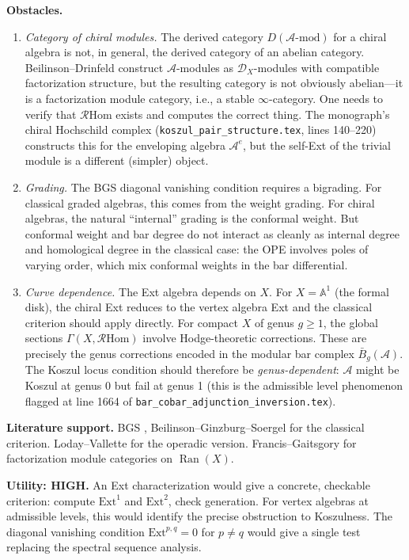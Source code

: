 \documentclass[11pt]{article}
\theoremstyle{remark}
\newcommand{\cA}{\mathcal{A}}
\newcommand{\barB}{\bar{B}}
\newcommand{\Ext}{\mathrm{Ext}}
\newcommand{\Hom}{\mathrm{Hom}}
\newcommand{\Ran}{\operatorname{Ran}}
\begin{document}
\textbf{Obstacles.}
\begin{enumerate}[label=(A\arabic*)]
\item \emph{Category of chiral modules.}  The derived category $D(\cA\text{-mod})$ for a chiral algebra is not, in general, the derived category of an abelian category.  Beilinson--Drinfeld \cite{BD04} construct $\cA$-modules as $\mathcal{D}_X$-modules with compatible factorization structure, but the resulting category is not obviously abelian---it is a factorization module category, i.e., a stable $\infty$-category.  One needs to verify that $\mathcal{R}\!\Hom$ exists and computes the correct thing.  The monograph's chiral Hochschild complex (\texttt{koszul\_pair\_structure.tex}, lines 140--220) constructs this for the enveloping algebra $\cA^e$, but the self-Ext of the trivial module is a different (simpler) object.

\item \emph{Grading.}  The BGS diagonal vanishing condition requires a bigrading.  For classical graded algebras, this comes from the weight grading.  For chiral algebras, the natural ``internal'' grading is the conformal weight.  But conformal weight and bar degree do not interact as cleanly as internal degree and homological degree in the classical case: the OPE involves poles of varying order, which mix conformal weights in the bar differential.

\item \emph{Curve dependence.}  The Ext algebra depends on $X$.  For $X = \mathbb{A}^1$ (the formal disk), the chiral Ext reduces to the vertex algebra Ext and the classical criterion should apply directly.  For compact $X$ of genus $g \geq 1$, the global sections $\Gamma(X, \mathcal{R}\!\Hom)$ involve Hodge-theoretic corrections.  These are precisely the genus corrections encoded in the modular bar complex $\barB_g(\cA)$.  The Koszul locus condition should therefore be \emph{genus-dependent}: $\cA$ might be Koszul at genus 0 but fail at genus 1 (this is the admissible level phenomenon flagged at line 1664 of \texttt{bar\_cobar\_adjunction\_inversion.tex}).
\end{enumerate}

\textbf{Literature support.}  BGS \cite{BGS96}, Beilinson--Ginzburg--Soergel for the classical criterion.  Loday--Vallette \cite{LV12} for the operadic version.  Francis--Gaitsgory \cite{FG12} for factorization module categories on $\Ran(X)$.

\textbf{Utility: HIGH.}  An Ext characterization would give a concrete, checkable criterion: compute $\Ext^1$ and $\Ext^2$, check generation.  For vertex algebras at admissible levels, this would identify the precise obstruction to Koszulness.  The diagonal vanishing condition $\Ext^{p,q} = 0$ for $p \neq q$ would give a single test replacing the spectral sequence analysis.
\end{document}
